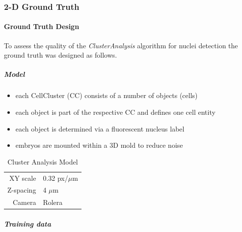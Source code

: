 \documentclass[11pt,singlespacinge,twoside]{reedthesis} %
\providecommand{\tightlist}{%
  \setlength{\itemsep}{0pt}\setlength{\parskip}{0pt}}
\begin{document}
\hypertarget{d-ground-truth}{%
\subsubsection{2-D Ground Truth}\label{d-ground-truth}}

\hypertarget{ground-truth-design}{%
\paragraph{Ground Truth Design}\label{ground-truth-design}}

To assess the quality of the \emph{ClusterAnalysis} algorithm for nuclei detection the ground truth was designed as follows.

\hypertarget{model}{%
\subparagraph{Model}\label{model}}
\begin{itemize}
\tightlist
\item
  each CellCluster (CC) consists of a number of objects (cells)
\item
  each object is part of the respective CC and defines one cell entity
\item
  each object is determined via a fluorescent nucleus label
\item
  embryos are mounted within a 3D mold to reduce noise
\end{itemize}
\begin{longtable}[]{@{}rl@{}}
\caption{\label{tab:imgcond3DGrT} Cluster Analysis Model}\tabularnewline
\toprule
\endhead
\begin{minipage}[t]{0.46\columnwidth}\raggedleft
XY scale\strut
\end{minipage} & \begin{minipage}[t]{0.46\columnwidth}\raggedright
0.32 px/\(\mu\)m\strut
\end{minipage}\tabularnewline
\begin{minipage}[t]{0.46\columnwidth}\raggedleft
Z-spacing\strut
\end{minipage} & \begin{minipage}[t]{0.46\columnwidth}\raggedright
4 \(\mu\)m\strut
\end{minipage}\tabularnewline
\begin{minipage}[t]{0.46\columnwidth}\raggedleft
Camera\strut
\end{minipage} & \begin{minipage}[t]{0.46\columnwidth}\raggedright
Rolera\strut
\end{minipage}\tabularnewline
\bottomrule
\end{longtable}
\hypertarget{training-data}{%
\subparagraph{Training data}\label{training-data}}
\end{document}
